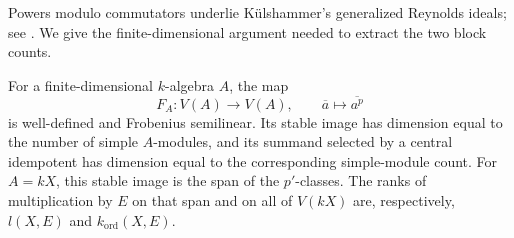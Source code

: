 Powers modulo commutators underlie K\"ulshammer's generalized Reynolds
ideals; see \cite[Section~2]{HHKM2005}. We give the finite-dimensional
argument needed to extract the two block counts.

\begin{lemma}\label{lem:cocenter-ranks}
For a finite-dimensional $k$-algebra $A$, the map
\[
 F_A:V(A)\longrightarrow V(A),\qquad
 \overline a\longmapsto\overline{a^p}
\]
is well-defined and Frobenius semilinear. Its stable image has
dimension equal to the number of simple $A$-modules, and its
summand selected by a central idempotent has dimension equal to
the corresponding simple-module count.
For $A=kX$, this stable image is the span of the $p'$-classes.
The ranks of multiplication by $E$ on that span and on all of
$V(kX)$ are, respectively, $l(X,E)$ and $k_{\mathrm{ord}}(X,E)$.
\end{lemma}

